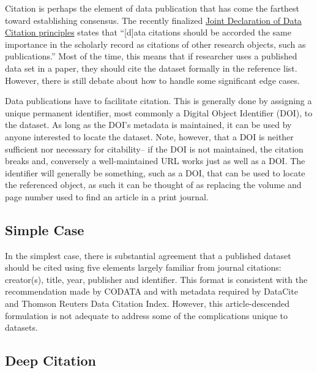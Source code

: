 \documentclass[10pt,a4paper,twocolumn]{article}
\begin{document}
Citation is perhaps the element of data publication that has come the farthest toward establishing consensus.
The recently finalized \href{http://www.force11.org/datacitation}{Joint Declaration of Data Citation principles} states that ``[d]ata citations should be accorded the same importance in the scholarly record as citations of other research objects, such as publications.''
Most of the time, this means that if researcher uses a published data set in a paper, they should cite the dataset formally in the reference list. 
However, there is still debate about how to handle some significant edge cases. %

Data publications have to facilitate citation. %
This is generally done by assigning a unique permanent identifier, most commonly a Digital Object Identifier (DOI), to the dataset. 
As long as the DOI's metadata is maintained, it can be used by anyone interested to locate the dataset. 
Note, however, that a DOI is neither sufficient nor necessary for citability-- if the DOI is not maintained, the citation breaks and, conversely a well-maintained URL works just as well as a DOI. 
The identifier will generally be something, such as a DOI, that can be used to locate the referenced object, as such it can be thought of as replacing the volume and page number used to find an article in a print journal. %

\subsection*{Simple Case}\label{simple-case}

In the simplest case, there is substantial agreement that a published dataset should be cited using five elements largely familiar from journal citations: creator(s), title, year, publisher and identifier. 
This format is consistent with the recommendation made by CODATA\cite{socha_out_2013} and with metadata required by DataCite \cite{datacite_datacite_2013} and Thomson Reuters Data Citation Index. However, this article-descended formulation is not adequate to address some of the complications unique to datasets. %

\subsection*{Deep Citation}\label{deep-citation}
\end{document}
